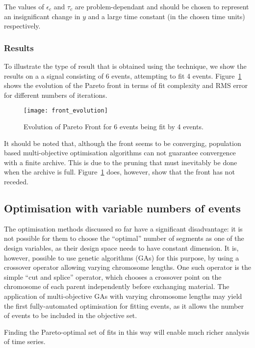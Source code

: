 The values of $\epsilon_c$ and $\tau_c$ are problem-dependant and
should be chosen to represent an insignificant change in $y$ and a
large time constant (in the chosen time units) respectively.


\subsubsection{Results}
To illustrate the type of result that is obtained using the technique,
we show the results on a a signal consisting of 6 events, attempting
to fit 4 events.  Figure~\ref{fig:front_evolution} shows the evolution
of the Pareto front in terms of fit complexity and RMS error for
different numbers of iterations.

\begin{figure}[htbp]
  \centering
  \texttt{[image: front\_evolution]}
  \caption{Evolution of Pareto Front for 6 events being fit by 4 events.}
  \label{fig:front_evolution}
\end{figure}

It should be noted that, although the front seems to be converging,
population based multi-objective optimisation algorithms can not
guarantee convergence with a finite archive.  This is due to the
pruning that must inevitably be done when the archive is full.
Figure~\ref{fig:front_evolution} does, however, show that the front has not
receded.

\subsection{Optimisation with variable numbers of events}
The optimisation methods discussed so far have a significant
disadvantage: it is not possible for them to choose the ``optimal''
number of segments as one of the design variables, as their design space
needs to have constant dimension. It is, however, possible to use
genetic algorithms (GAs) for this purpose, by using a crossover
operator allowing varying chromosome lengths.  One such operator is
the simple ``cut and splice'' operator, which chooses a crossover
point on the chromosome of each parent independently before exchanging
material.  The application of multi-objective GAs with varying
chromosome lengths may yield the first fully-automated optimisation
for fitting events, as it allows the number of events to be included
in the objective set.

Finding the Pareto-optimal set of fits in this way will enable much
richer analysis of time series.

